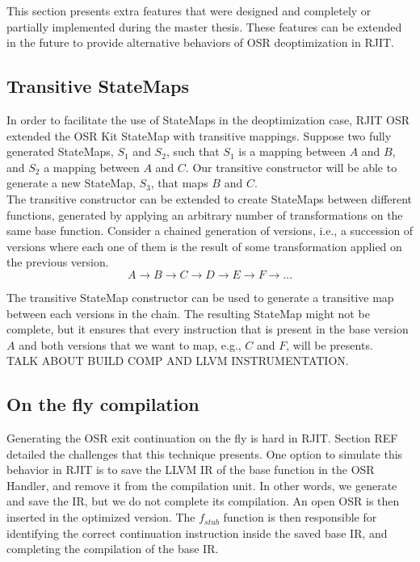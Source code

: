 This section presents extra features that were designed and completely or partially implemented during the master thesis.
These features can be extended in the future to provide alternative behaviors of OSR deoptimization in RJIT.\\

\subsection{Transitive StateMaps}
In order to facilitate the use of StateMaps in the deoptimization case, RJIT OSR extended the OSR Kit\cite{OSRKit} StateMap with transitive mappings.
Suppose two fully generated StateMaps, $S_1$ and $S_2$, such that $S_1$ is a mapping between $A$ and $B$, and $S_2$ a mapping between $A$ and $C$.
Our transitive constructor will be able to generate a new StateMap, $S_3$, that maps $B$ and $C$.\\

The transitive constructor can be extended to create StateMaps between different functions, generated by applying an arbitrary number of transformations on the same base function.
Consider a chained generation of versions, i.e., a succession of versions where each one of them is the result of some transformation applied on the previous version.
$$A \rightarrow B \rightarrow C \rightarrow D \rightarrow E \rightarrow F \rightarrow ...$$

The transitive StateMap constructor can be used to generate a transitive map between each versions in the chain.
The resulting StateMap might not be complete, but it ensures that every instruction that is present in the base version $A$ and both versions that we want to map, e.g., $C$ and $F$, will be presents.\\

TALK ABOUT BUILD COMP AND LLVM INSTRUMENTATION.\\

\subsection{On the fly compilation}

Generating the OSR exit continuation on the fly is hard in RJIT. 
Section REF detailed the challenges that this technique presents.
One option to simulate this behavior in RJIT is to save the LLVM IR of the base function in the OSR Handler, and remove it from the compilation unit.
In other words, we generate and save the IR, but we do not complete its compilation.
An open OSR is then inserted in the optimized version. 
The $f_{stub}$ function is then responsible for identifying the correct continuation instruction inside the saved base IR, and completing the compilation of the base IR.\\

